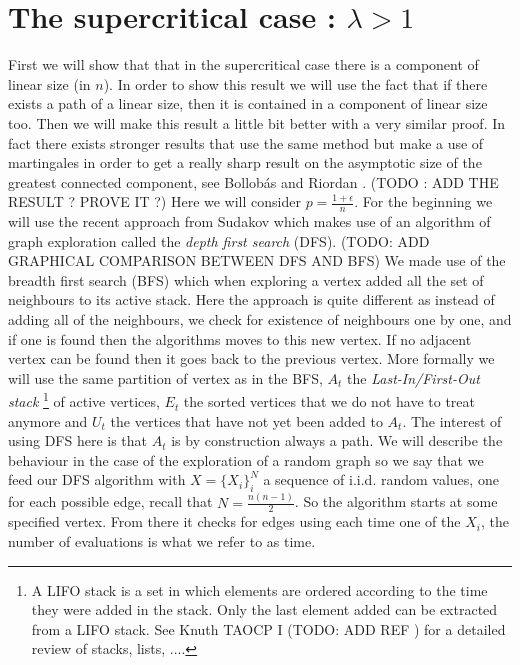 \section{The supercritical case : $\lambda > 1 $ }
First we will show that that in the supercritical case there is a component of linear size (in $n$). In order to show this result we will use the fact that if there exists a path of a linear size, then it is contained in a component of linear size too. Then we will make this result a little bit better with a very similar proof.
\newline
In fact there exists stronger results that use the same method but make a use of martingales in order to get a really sharp result on the asymptotic size of the greatest connected component, see Bollob\'as and Riordan \cite{BollobRiordan12}. (TODO : ADD THE RESULT ? PROVE IT ?)
\newline
Here we will consider $p = \frac{1 + \epsilon}{n}$. 
For the beginning we will use the recent approach from Sudakov \cite{Sudakov} which makes use of an algorithm of graph exploration called the \emph{depth first search} (DFS).
(TODO: ADD GRAPHICAL COMPARISON BETWEEN DFS AND BFS)
We made use of the breadth first search (BFS) which when exploring a vertex added all the set of neighbours to its active stack.
Here the approach is quite different as instead of adding all of the neighbours, we check for existence of neighbours one by one, and if one is found then the algorithms moves to this new vertex. If no adjacent vertex can be found then it goes back to the previous vertex.
\newline
More formally we will use the same partition of vertex as in the BFS, $A_t$ the \emph{Last-In/First-Out stack}
\footnote{A LIFO stack is a set in which elements are ordered according to the time they were added in the stack. 
Only the last element added can be extracted from a LIFO stack. See Knuth TAOCP I (TODO: ADD REF ) for a detailed review of stacks, lists, ....}
of active vertices, $E_t$ the sorted vertices that we do not have to treat anymore and $U_t$ the vertices that have not yet been added to $A_t$.
The interest of using DFS here is that $A_t$ is by construction always a path.
\newline
We will describe the behaviour in the case of the exploration of a random graph so we say that we feed our DFS algorithm with $X = \{X_i\}_i^N$ a sequence of i.i.d. random values, one for each possible edge, recall that $N = \frac{n(n-1)}{2}$.
So the algorithm starts at some specified vertex. From there it checks for edges using each time one of the $X_i$, the number of evaluations is what we refer to as time.
